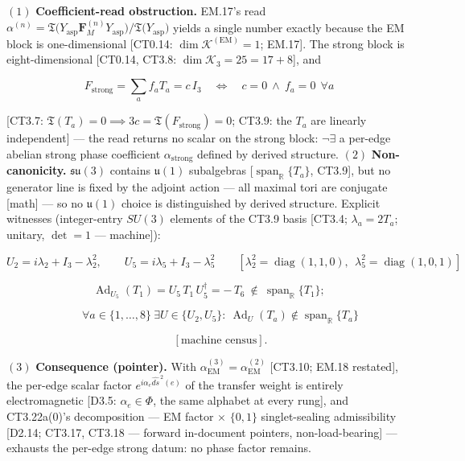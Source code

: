 \begin{corollary}\label{tag:CT3-10a}
$(1)$ \textbf{Coefficient-read obstruction.} EM.17's read $\alpha^{(n)}=\mathfrak T\bigl(Y_{\mathrm{asp}}\mathbf F_M^{(n)}Y_{\mathrm{asp}}\bigr)/\mathfrak T\bigl(Y_{\mathrm{asp}}\bigr)$ yields a single number exactly because the EM block is one-dimensional [CT0.14: $\dim\mathcal K^{(\mathrm{EM})}=1$; EM.17]. The strong block is eight-dimensional [CT0.14, CT3.8: $\dim\mathcal K_3=25=17+8$], and

\[
F_{\mathrm{strong}}=\textstyle\sum_af_aT_a=c\,I_3\quad\iff\quad c=0\ \wedge\ f_a=0\ \ \forall a
\]

[CT3.7: $\mathfrak T(T_a)=0\implies3c=\mathfrak T(F_{\mathrm{strong}})=0$; CT3.9: the $T_a$ are linearly independent] — the read returns no scalar on the strong block: $\neg\exists$ a per-edge abelian strong phase coefficient $\alpha_{\mathrm{strong}}$ defined by derived structure. $(2)$ \textbf{Non-canonicity.} $\mathfrak{su}(3)$ contains $\mathfrak u(1)$ subalgebras [$\operatorname{span}_{\mathbb R}\{T_a\}$, CT3.9], but no generator line is fixed by the adjoint action — all maximal tori are conjugate [math] — so no $\mathfrak u(1)$ choice is distinguished by derived structure. Explicit witnesses (integer-entry $SU(3)$ elements of the CT3.9 basis [CT3.4; $\lambda_a=2T_a$; unitary, $\det=1$ — machine]):

\[
U_2=i\lambda_2+I_3-\lambda_2^{2},\qquad U_5=i\lambda_5+I_3-\lambda_5^{2}\qquad[\lambda_2^{2}=\operatorname{diag}(1,1,0),\ \ \lambda_5^{2}=\operatorname{diag}(1,0,1)]
\]

\[
\operatorname{Ad}_{U_5}(T_1)=U_5\,T_1\,U_5^{\dagger}=-\,T_6\ \notin\ \operatorname{span}_{\mathbb R}\{T_1\};
\]

\[
\qquad \forall a\in\{1,\dots,8\}\ \exists U\in\{U_2,U_5\}:\ \operatorname{Ad}_U(T_a)\notin\operatorname{span}_{\mathbb R}\{T_a\}
\]

\[
\qquad [\text{machine census}].
\]

$(3)$ \textbf{Consequence (pointer).} With $\alpha_{\mathrm{EM}}^{(3)}=\alpha_{\mathrm{EM}}^{(2)}$ [CT3.10; EM.18 restated], the per-edge scalar factor $e^{i\alpha_e\widehat{ds}^{\,2}(e)}$ of the transfer weight is entirely electromagnetic [D3.5: $\alpha_e\in\Phi$, the same alphabet at every rung], and CT3.22a(0)'s decomposition — EM factor $\times$ $\{0,1\}$ singlet-sealing admissibility [D2.14; CT3.17, CT3.18 — forward in-document pointers, non-load-bearing] — exhausts the per-edge strong datum: no phase factor remains.


\end{corollary}
